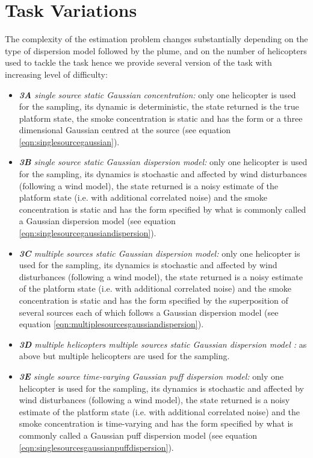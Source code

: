 \documentclass[a4paper,11pt]{report}
\begin{document}
\section{Task Variations}  \label{PlumeVariations}
The complexity of the estimation problem changes substantially depending on the type of dispersion model followed by the plume, and on the number of helicopters used to tackle the task hence we provide several version of the task with increasing level of difficulty:
\begin{itemize}
\item \textit{\textbf{3A} single source static Gaussian concentration:} only one helicopter is used for the sampling, its dynamic is deterministic, the state returned is the true platform state, the smoke concentration is static and has the form or a three dimensional Gaussian centred at the source (see equation \ref{eqn:singlesourcegaussian}).

\item \textit{\textbf{3B} single source static Gaussian dispersion model:} only one helicopter is used for the sampling, its dynamics is stochastic and affected by wind disturbances (following a wind model), the state returned is a noisy estimate of the platform state (i.e. with additional correlated noise) and the smoke concentration is static and has the form specified by what is commonly called a Gaussian dispersion model (see equation \ref{eqn:singlesourcegaussiandispersion}).

\item \textit{\textbf{3C} multiple sources static Gaussian dispersion model:} only one helicopter is used for the sampling, its dynamics is stochastic and affected by wind disturbances (following a wind model), the state returned is a noisy estimate of the platform state (i.e. with additional correlated noise) and the smoke concentration is static and has the form specified by the superposition of several sources each of which follows a Gaussian dispersion model (see equation \ref{eqn:multiplesourcesgaussiandispersion}).

\item \textit{\textbf{3D} multiple helicopters multiple sources static Gaussian dispersion model :} as above but multiple helicopters are used for the sampling.

\item \textit{\textbf{3E} single source time-varying Gaussian puff dispersion model:} only one helicopter is used for the sampling, its dynamics is stochastic and affected by wind disturbances (following a wind model), the state returned is a noisy estimate of the platform state (i.e. with additional correlated noise) and the smoke concentration is time-varying and has the form specified by what is commonly called a Gaussian puff dispersion model (see equation \ref{eqn:singlesourcesgaussianpuffdispersion}).


\end{itemize}
\end{document}
